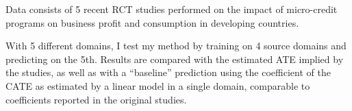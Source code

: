 \documentclass[a4paper,12pt]{article}
\begin{document}
Data consists of 5 recent RCT studies performed on the impact of micro-credit programs on business profit and consumption in developing countries. 

With 5 different domains, I test my method by training on 4 source domains and predicting on the 5th. Results are compared with the estimated ATE implied by the studies, as well as with a ``baseline'' prediction using the coefficient of the CATE as estimated by a linear model in a single domain, comparable to coefficients reported in the original studies. 














\end{document}
